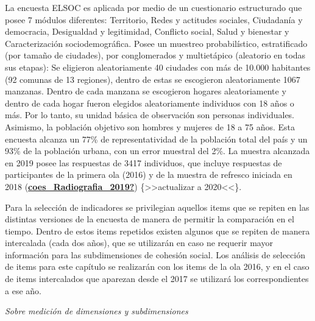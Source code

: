 \documentclass[
  12pt,
]{book}
\begin{document}
La encuesta ELSOC es aplicada por medio de un cuestionario estructurado que posee 7 módulos diferentes: Territorio, Redes y actitudes sociales, Ciudadanía y democracia, Desigualdad y legitimidad, Conflicto social, Salud y bienestar y Caracterización sociodemográfica. Posee un muestreo probabilístico, estratificado (por tamaño de ciudades), por conglomerados y multietápico (aleatorio en todas sus etapas): Se eligieron aleatoriamente 40 ciudades con más de 10.000 habitantes (92 comunas de 13 regiones), dentro de estas se escogieron aleatoriamente 1067 manzanas. Dentro de cada manzana se escogieron hogares aleatoriamente y dentro de cada hogar fueron elegidos aleatoriamente individuos con 18 años o más. Por lo tanto, su unidad básica de observación son personas individuales. Asimismo, la población objetivo son hombres y mujeres de 18 a 75 años. Esta encuesta alcanza un 77\% de representatividad de la población total del país y un 93\% de la población urbana, con un error muestral del 2\%. La muestra alcanzada en 2019 posee las respuestas de 3417 individuos, que incluye respuestas de participantes de la primera ola (2016) y de la muestra de refresco iniciada en 2018 (\protect\hyperlink{ref-coes_Radiografia_2019}{\textbf{coes\_Radiografia\_2019?}}) \{\textgreater\textgreater actualizar a 2020\textless\textless\}.

Para la selección de indicadores se privilegian aquellos items que se repiten en las distintas versiones de la encuesta de manera de permitir la comparación en el tiempo. Dentro de estos items repetidos existen algunos que se repiten de manera intercalada (cada dos años), que se utilizarán en caso ne requerir mayor información para las subdimensiones de cohesión social. Los análisis de selección de items para este capítulo se realizarán con los items de la ola 2016, y en el caso de items intercalados que aparezan desde el 2017 se utilizará los correspondientes a ese año.

\emph{Sobre medición de dimensiones y subdimensiones}
\end{document}
